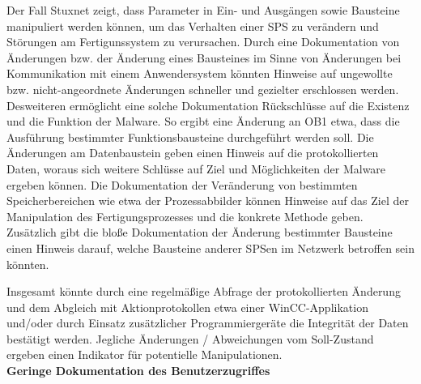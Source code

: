 Der Fall Stuxnet zeigt, dass Parameter in Ein- und Ausgängen sowie Bausteine manipuliert werden können, um das Verhalten einer SPS zu verändern und Störungen am Fertigunssystem zu verursachen. Durch eine Dokumentation von Änderungen bzw. der Änderung eines Bausteines im Sinne von Änderungen bei Kommunikation mit einem Anwendersystem könnten Hinweise auf ungewollte bzw. nicht-angeordnete Änderungen schneller und gezielter erschlossen werden. Desweiteren ermöglicht eine solche Dokumentation Rückschlüsse auf die Existenz und die Funktion der Malware. So ergibt eine Änderung an OB1 etwa, dass die Ausführung bestimmter Funktionsbausteine durchgeführt werden soll. Die Änderungen am Datenbaustein geben einen Hinweis auf die protokollierten Daten, woraus sich weitere Schlüsse auf Ziel und Möglichkeiten der Malware ergeben können. Die Dokumentation der Veränderung von bestimmten Speicherbereichen wie etwa der Prozessabbilder können Hinweise auf das Ziel der Manipulation des Fertigungsprozesses und die konkrete Methode geben. Zusätzlich gibt die bloße Dokumentation der Änderung bestimmter Bausteine einen Hinweis darauf, welche Bausteine anderer SPSen im Netzwerk betroffen sein könnten.

Insgesamt könnte durch eine regelmäßige Abfrage der protokollierten Änderung und dem Abgleich mit Aktionprotokollen etwa einer WinCC-Applikation und/oder durch Einsatz zusätzlicher Programmiergeräte die Integrität der Daten bestätigt werden. Jegliche Änderungen / Abweichungen vom Soll-Zustand ergeben einen Indikator für potentielle Manipulationen.\\

\textbf{Geringe Dokumentation des Benutzerzugriffes}

